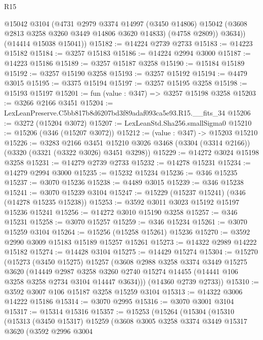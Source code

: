 \begin{lexlean}{R15}
\begin{coremodule}
          @15042
          @3104
          (@4731
            @2979
            @3374
            @14997
            (@3450 @14806)
            @15042
            (@3608 @2813 @3258 @3260 @3449 @14806 @3620 @14833)
            (@4758 @2809))
          @3634))
      (@14414 @15038 @15041))
@15182 := @14224 @2739 @2733
@15183 := @14223 @15182
@15184 := @3257 @15183
@15186 := @14224 @2994 @3000
@15187 := @14223 @15186
@15189 := @3257 @15187 @3258
@15190 := @15184 @15189
@15192 := @3257 @15190 @3258
@15193 := @3257 @15192
@15194 := @4479 @3015
@15195 := @3375 @15194
@15197 := @3257 @15195 @3258
@15198 := @15193 @15197
@15201 := fun (value : @347) => @3257 @15198 @3258
@15203 := @3266 @2166 @3451
@15204 := LexLeanPreserve.C5bb817b8d6207bd3f89adaf093ca5e93.R15.__fits_34
@15206 := @3272 (@15204 @3072)
@15207 := LexLeanStd.Sha256.smallSigma0
@15210 := @15206 (@346 (@15207 @3072))
@15212 := (value : @347) -> @15203 @15210
@15226 := @3283
    @2166
    @3451
    @15210
    @3026
    @3468
    (@3304 (@3314 @2166))
    (@3320 (@3321 (@3322 @3026) @3451 @3298))
@15229 := @14272 @3024 @15198 @3258
@15231 := @14279 @2739 @2733
@15232 := @14278 @15231
@15234 := @14279 @2994 @3000
@15235 := @15232 @15234
@15236 := @346 @15235
@15237 := @3070 @15236
@15238 := @4489 @3015
@15239 := @346 @15238
@15241 := @3070 @15239 @3104
@15247 := @15229 (@15237 @15241) (@346 (@14278 @15235 @15238))
@15253 := @3592 @3011 @3023 @15192 @15197 @15236 @15241
@15256 := @14272 @3010 @15190 @3258
@15257 := @346 @15231
@15258 := @3070 @15257
@15259 := @346 @15234
@15261 := @3070 @15259 @3104
@15264 := @15256 (@15258 @15261) @15236
@15270 := @3592 @2990 @3009 @15183 @15189 @15257 @15261
@15273 := @14322 @2989 @14222 @15182
@15274 := @14428 @3104
@15275 := @14429 @15274
@15304 := @15270
    (@15273
      (@3450 @15275)
      @15257
      (@3608
        @2988
        @3258
        @3374
        @3449
        @15275
        @3620
        (@14449
          @2987
          @3258
          @3260
          @2740
          @15274
          @14455
          (@14441 @106 @3258 @3258 @2734 @3104 @14447 @3634)))
      (@14360 @2739 @2733))
@15310 := @3592 @3007 @106 @15187 @3258 @15259 @3104
@15313 := @14322 @3006 @14222 @15186
@15314 := @3070 @2995
@15316 := @3070 @3001 @3104
@15317 := @15314 @15316
@15357 := @15253
    (@15264
      (@15304
        (@15310
          (@15313
            (@3450 @15317)
            @15259
            (@3608
              @3005
              @3258
              @3374
              @3449
              @15317
              @3620
              (@3592
                @2996
                @3004

\end{coremodule}
\end{lexlean}

